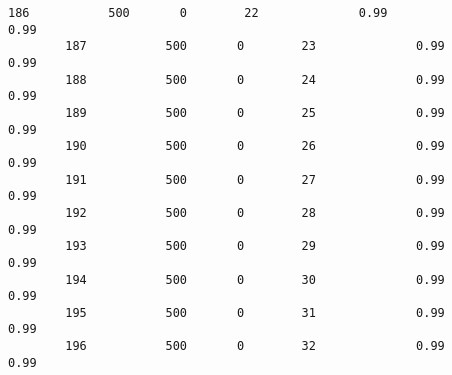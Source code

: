 \documentclass[11pt]{article}
\begin{document}
\begin{Verbatim}[commandchars=\\\{\}]
        186           500       0        22              0.99              0.99   
        187           500       0        23              0.99              0.99   
        188           500       0        24              0.99              0.99   
        189           500       0        25              0.99              0.99   
        190           500       0        26              0.99              0.99   
        191           500       0        27              0.99              0.99   
        192           500       0        28              0.99              0.99   
        193           500       0        29              0.99              0.99   
        194           500       0        30              0.99              0.99   
        195           500       0        31              0.99              0.99   
        196           500       0        32              0.99              0.99   
        

\end{Verbatim}
\end{document}

